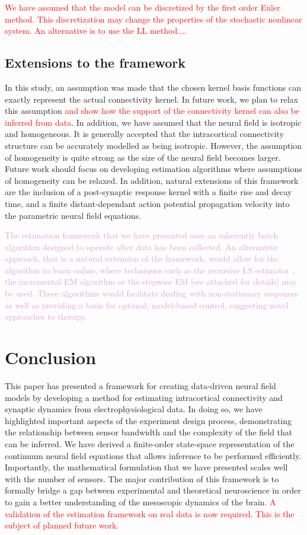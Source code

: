 \documentclass[review,authoryear,3p]{elsarticle}
\newcommand{\dean}[1]{\textcolor{red}{#1}}
\newcommand{\mike}[1]{\textcolor{Plum}{#1}}
\begin{document}
\dean{We have assumed that the model can be discretized by the first order Euler method. This discretization may change the properties of the stochastic nonlinear system. An alternative is to use the LL method....}

\subsection{Extensions to the framework}
In this study, an assumption was made that the chosen kernel basis functions can exactly represent the actual connectivity kernel. In future work, we plan to relax this assumption \dean{and show how the support of the connectivity kernel can also be inferred from data}. In addition, we have assumed that the neural field is isotropic and homogeneous. It is generally accepted that the intracortical connectivity structure can be accurately modelled as being isotropic. However, the assumption of homogeneity is quite strong as the size of the neural field becomes larger. Future work should focus on developing estimation algorithms where assumptions of homogeneity can be relaxed. In addition, natural extensions of this framework are the inclusion of a post-synaptic response kernel with a finite rise and decay time, and a finite distant-dependant action potential propagation velocity into the parametric neural field equations. 

\mike{The estimation framework that we have presented uses an inherently batch algorithm designed to operate after data has been collected. An alternative approach, that is a natural extension of the framework, would allow for the algorithm to learn online, where techniques such as the recursive LS estimator \cite{Ljung1999}, the incremental EM algorithm \cite{Neal1998} or the stepwise EM \cite{Sato00,Cappe09} [see attached for details] may be used. These algorithms would facilitate dealing with non-stationary responses as well as providing a basis for optimal, model-based control, suggesting novel approaches to therapy.}

\section{Conclusion}
This paper has presented a framework for creating data-driven neural field models by developing a method for estimating intracortical connectivity and synaptic dynamics from electrophysiological data. In doing so, we have highlighted important aspects of the experiment design process, demonstrating the relationship between sensor bandwidth and the complexity of the field that can be inferred. We have derived a finite-order state-space representation of the continuum neural field equations that allows inference to be performed efficiently. Importantly, the mathematical formulation that we have presented scales well with the number of sensors. The major contribution of this framework is to formally bridge a gap between experimental and theoretical neuroscience in order to gain a better understanding of the mesoscopic dynamics of the brain. \dean{A validation of the estimation framework on real data is now required. This is the subject of planned future work.}
\end{document}

